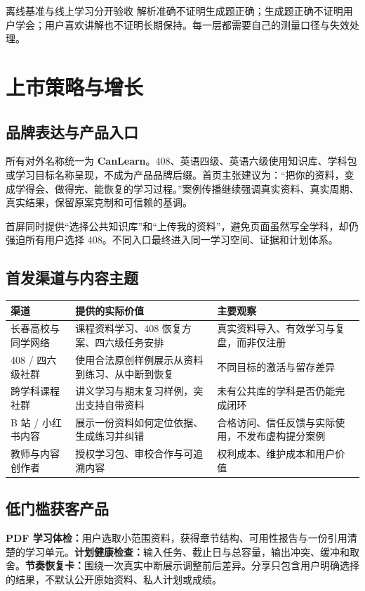 \documentclass[UTF8,a4paper,11pt,fontset=none]{ctexart}
\newcommand{\cth}[1]{\textbf{\sffamily #1}}
\newcommand{\newsec}[1]{\clearpage\section{#1}}
\newenvironment{tbl}{\par\vspace{3pt}\small\noindent\ignorespaces}{\unskip\par\vspace{5pt}}
\begin{document}
\begin{insight}{离线基准与线上学习分开验收}
解析准确不证明生成题正确；生成题正确不证明用户学会；用户喜欢讲解也不证明长期保持。每一层都需要自己的测量口径与失效处理。
\end{insight}

\newsec{上市策略与增长}
\subsection{品牌表达与产品入口}
所有对外名称统一为 \textbf{CanLearn}。408、英语四级、英语六级使用知识库、学科包或学习目标名称呈现，不成为产品品牌后缀。首页主张建议为：“把你的资料，变成学得会、做得完、能恢复的学习过程。”案例传播继续强调真实资料、真实周期、真实结果，保留原案克制和可信赖的基调。\cite{original}

首屏同时提供“选择公共知识库”和“上传我的资料”，避免页面虽然写全学科，却仍强迫所有用户选择 408。不同入口最终进入同一学习空间、证据和计划体系。

\subsection{首发渠道与内容主题}
\begin{tbl}
\begin{tabularx}{\linewidth}{@{}L{30mm}YY@{}}
\toprule
\cth{渠道}&\cth{提供的实际价值}&\cth{主要观察}\\\midrule
长春高校与同学网络&课程资料学习、408 恢复方案、四六级任务安排&真实资料导入、有效学习与复盘，而非仅注册\\
408 / 四六级社群&使用合法原创样例展示从资料到练习、从中断到恢复&不同目标的激活与留存差异\\
跨学科课程社群&讲义学习与期末复习样例，突出支持自带资料&未有公共库的学科是否仍能完成闭环\\
B 站 / 小红书内容&展示一份资料如何定位依据、生成练习并纠错&合格访问、信任反馈与实际使用，不发布虚构提分案例\\
教师与内容创作者&授权学习包、审校合作与可追溯内容&权利成本、维护成本和用户价值\\
\bottomrule
\end{tabularx}
\end{tbl}

\subsection{低门槛获客产品}
\textbf{PDF 学习体检：}用户选取小范围资料，获得章节结构、可用性报告与一份引用清楚的学习单元。\textbf{计划健康检查：}输入任务、截止日与总容量，输出冲突、缓冲和取舍。\textbf{节奏恢复卡：}围绕一次真实中断展示调整前后差异。分享只包含用户明确选择的结果，不默认公开原始资料、私人计划或成绩。
\end{document}

